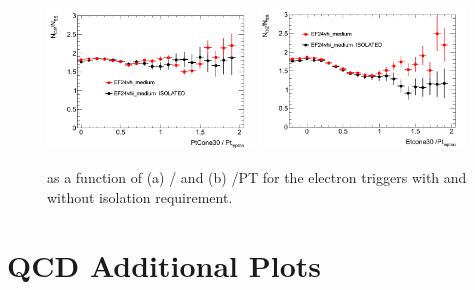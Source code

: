\begin{figure}[t]
\begin{center}
\includegraphics[width=0.49\textwidth]{figure/appendix/trig_comp_ptcone3.png}
\includegraphics[width=0.49\textwidth]{figure/appendix/trig_comp_etcone3.png}
\end{center}
\caption{\rqcd  as a function of (a) \ptcone / \PT and (b) \etcone /PT for the electron triggers with and without isolation requirement.} 
\label{fig:trigRatio}
\end{figure}

\clearpage

\chapter{QCD Additional Plots}
\label{appendix:qcd_additional}

